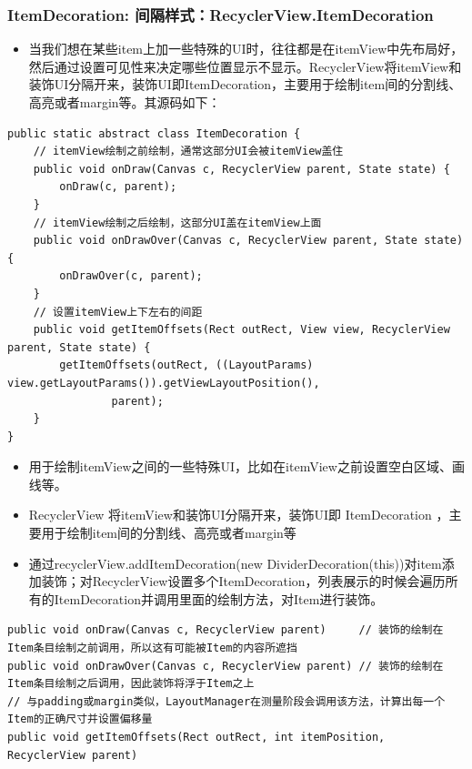 \documentclass[9pt, b5paper]{article}
\begin{document}
\subsubsection{ItemDecoration: 间隔样式：RecyclerView.ItemDecoration}
\label{sec-5-3-4}
\begin{itemize}
\item 当我们想在某些item上加一些特殊的UI时，往往都是在itemView中先布局好，然后通过设置可见性来决定哪些位置显示不显示。RecyclerView将itemView和装饰UI分隔开来，装饰UI即ItemDecoration，主要用于绘制item间的分割线、高亮或者margin等。其源码如下：
\end{itemize}
\begin{verbatim}
public static abstract class ItemDecoration {
    // itemView绘制之前绘制，通常这部分UI会被itemView盖住
    public void onDraw(Canvas c, RecyclerView parent, State state) {
        onDraw(c, parent);
    }
    // itemView绘制之后绘制，这部分UI盖在itemView上面
    public void onDrawOver(Canvas c, RecyclerView parent, State state) {
        onDrawOver(c, parent);
    }
    // 设置itemView上下左右的间距
    public void getItemOffsets(Rect outRect, View view, RecyclerView parent, State state) {
        getItemOffsets(outRect, ((LayoutParams) view.getLayoutParams()).getViewLayoutPosition(),
                parent);
    }
}
\end{verbatim}
\begin{itemize}
\item 用于绘制itemView之间的一些特殊UI，比如在itemView之前设置空白区域、画线等。
\item RecyclerView 将itemView和装饰UI分隔开来，装饰UI即 ItemDecoration ，主要用于绘制item间的分割线、高亮或者margin等
\item 通过recyclerView.addItemDecoration(new DividerDecoration(this))对item添加装饰；对RecyclerView设置多个ItemDecoration，列表展示的时候会遍历所有的ItemDecoration并调用里面的绘制方法，对Item进行装饰。
\end{itemize}
\begin{verbatim}
public void onDraw(Canvas c, RecyclerView parent)     // 装饰的绘制在Item条目绘制之前调用，所以这有可能被Item的内容所遮挡
public void onDrawOver(Canvas c, RecyclerView parent) // 装饰的绘制在Item条目绘制之后调用，因此装饰将浮于Item之上
// 与padding或margin类似，LayoutManager在测量阶段会调用该方法，计算出每一个Item的正确尺寸并设置偏移量
public void getItemOffsets(Rect outRect, int itemPosition, RecyclerView parent)
\end{verbatim}
\end{document}
